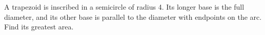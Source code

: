 A trapezoid is inscribed in a semicircle of radius 4. Its longer base is the full diameter, and its other base is parallel to the diameter with endpoints on the arc. Find its greatest area.
